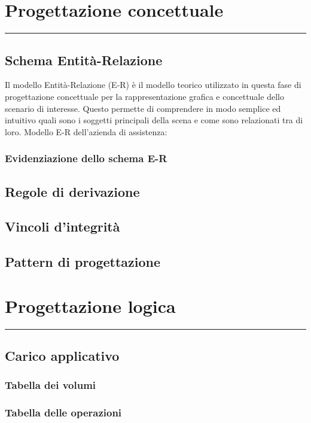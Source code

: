 \documentclass[a4paper]{article}
\begin{document}
\newpage
\section{Progettazione concettuale}
\rule{\linewidth}{1.5pt}
\subsection{Schema Entità-Relazione}
Il modello Entità-Relazione (E-R) è il modello teorico utilizzato in questa fase di progettazione concettuale per la rappresentazione grafica e concettuale dello scenario di interesse. Questo permette di comprendere in modo semplice ed intuitivo quali sono i soggetti principali della scena e come sono relazionati tra di loro. 
Modello E-R dell'azienda di assistenza:
\subsubsection{Evidenziazione dello schema E-R}

\subsection{Regole di derivazione}

\subsection{Vincoli d'integrità}

\subsection{Pattern di progettazione}

\newpage
\section{Progettazione logica}
\rule{\linewidth}{1.5pt}

\subsection{Carico applicativo}
\subsubsection{Tabella dei volumi}
\subsubsection{Tabella delle operazioni}
\end{document}
